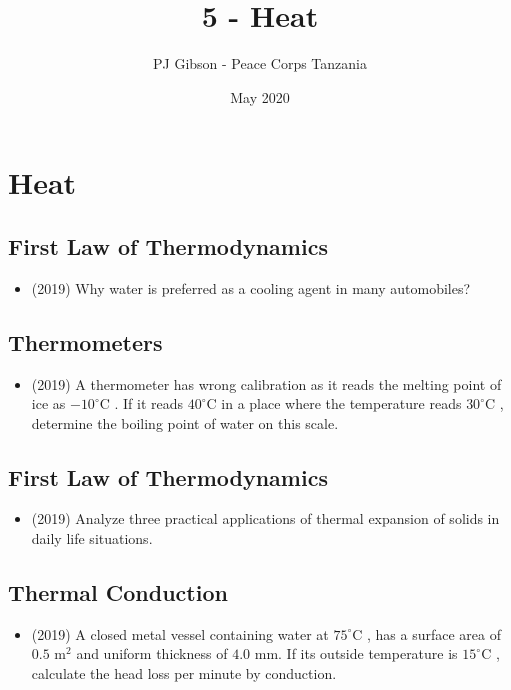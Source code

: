 \documentclass{article}
\title{5 - Heat}
\author{PJ Gibson - Peace Corps Tanzania}
\date{May 2020}
\begin{document}
\maketitle


\section{Heat}

\subsection{First Law of Thermodynamics}
\begin{itemize}
\item (2019)  Why water is preferred as a cooling agent in many automobiles?
\end{itemize}

\subsection{Thermometers}
\begin{itemize}
\item (2019)  A thermometer has wrong calibration as it reads the melting point of ice as $ -10^{\circ}$C . If it reads $ 40^{\circ}$C in a place where the temperature reads $ 30^{\circ}$C ,  determine the boiling point of water on this scale.
\end{itemize}

\subsection{First Law of Thermodynamics}
\begin{itemize}
\item (2019)  Analyze  three practical applications of thermal expansion of solids in daily life situations.
\end{itemize}

\subsection{Thermal Conduction}
\begin{itemize}
\item (2019)  A closed metal vessel containing water at $ 75^{\circ}$C , has a surface area of $ 0.5$ m$ ^{2}$ and uniform thickness of $ 4.0$ mm.  If its outside temperature is $ 15^{\circ}$C , calculate the head loss per minute by conduction.
\end{itemize}
\end{document}
